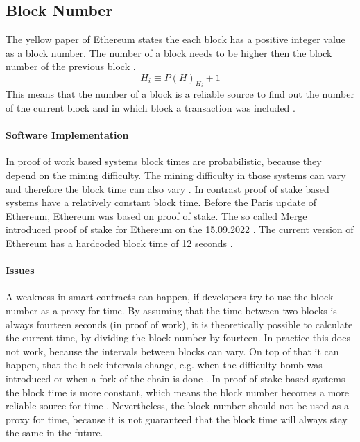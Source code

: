 
\subsection{Block Number}

The yellow paper of Ethereum states the each block has a positive integer value
as a block number. The number of a block needs to be higher then the block
number of the previous block \cite{ethyellowpaper2023}.
\begin{equation} \label{eq:blocknumber}
    H_i \equiv P(H)_{H_i} + 1
\end{equation}
This means that the number of a block is a reliable source to find out the
number of the current block and in which block a transaction was included
\cite{eth_blocks}.

\paragraph{Software Implementation}
In proof of work based systems block times are probabilistic, because they
depend on the mining difficulty. The mining difficulty in those systems can
vary and therefore the block time can also vary \cite{eth_blocks}. \newline In
contrast proof of stake based systems have a relatively constant block time.
Before the Paris update of Ethereum, Ethereum was based on proof of stake. The
so called Merge introduced proof of stake for Ethereum on the 15.09.2022
\cite{eth_history}. The current version of Ethereum has a hardcoded block time
of 12 seconds \cite{eth_blocks}. \newline

\paragraph{Issues}
A weakness in smart contracts can happen, if developers try to use the block
number as a proxy for time. By assuming that the time between two blocks is
always fourteen seconds (in proof of work), it is theoretically possible to
calculate the current time, by dividing the block number by fourteen. In
practice this does not work, because the intervals between blocks can vary. On
top of that it can happen, that the block intervals change, e.g. when the
difficulty bomb was introduced or when a fork of the chain is done
\cite{swc116}. \newline In proof of stake based systems the block time is more
constant, which means the block number becomes a more reliable source for time
\cite{bellatrix_specs}. Nevertheless, the block number should not be used as a
proxy for time, because it is not guaranteed that the block time will always
stay the same in the future.	

